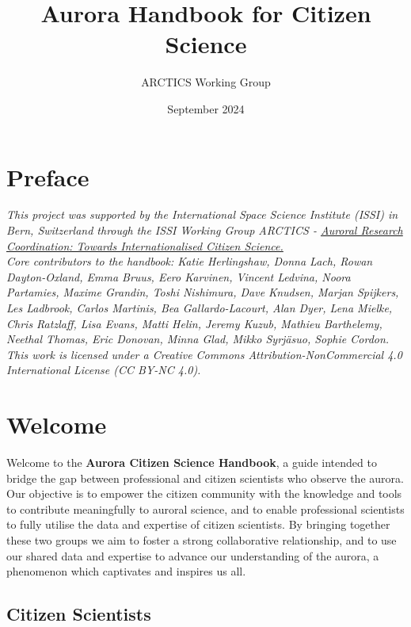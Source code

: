 \documentclass{article}
\title{Aurora Handbook for Citizen Science}
\author{ARCTICS Working Group}
\date{September 2024}
\newcommand{\contributed}[1]{%
    \par\noindent
    \begingroup
    \setlength{\leftskip}{1em}%
    \itshape
    Contributors: #1
    \par
    \endgroup
    \vspace{0.5em}
}
\begin{document}
\maketitle
\tableofcontents
\newpage

\section{Preface}

\textit{This project was supported by the International Space Science Institute (ISSI) in Bern, Switzerland through the ISSI Working Group ARCTICS - \href{https://collab.issibern.ch/arctics/}{Auroral Research Coordination: Towards Internationalised Citizen Science.}}\\

\textit{Core contributors to the handbook: Katie Herlingshaw, Donna Lach, Rowan Dayton-Oxland, Emma Bruus, Eero Karvinen, Vincent Ledvina, Noora Partamies, Maxime Grandin, Toshi Nishimura, Dave Knudsen, Marjan Spijkers, Les Ladbrook, Carlos Martinis, Bea Gallardo-Lacourt, Alan Dyer, Lena Mielke, Chris Ratzlaff, Lisa Evans, Matti Helin, Jeremy Kuzub, Mathieu Barthelemy, Neethal Thomas, Eric Donovan, Minna Glad, Mikko Syrjäsuo, Sophie Cordon.}\\

\textit{This work is licensed under a Creative Commons Attribution-NonCommercial 4.0 International License (CC BY-NC 4.0).}

 
\section{Welcome}
Welcome to the {\bf Aurora Citizen Science Handbook}, a guide intended to bridge the gap between professional and citizen scientists who observe the aurora. Our objective is to empower the citizen community with the knowledge and tools to contribute meaningfully to auroral science, and to enable professional scientists to fully utilise the data and expertise of citizen scientists. By bringing together these two groups we aim to foster a strong collaborative relationship, and to use our shared data and expertise to advance our understanding of the aurora, a phenomenon which captivates and inspires us all. 

\subsection{Citizen Scientists}
\vspace{0.5cm}
\noindent{}\\
\\
\end{document}
